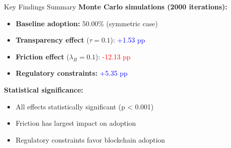 \documentclass{beamer}
\begin{document}
\begin{frame}{Key Findings Summary}
\textbf{Monte Carlo simulations (2000 iterations):}

\vspace{0.3cm}
\begin{itemize}
    \item \textbf{Baseline adoption:} 50.00\% (symmetric case)
    \item \textbf{Transparency effect} ($\tau=0.1$): \textcolor{blue}{+1.53 pp}
    \item \textbf{Friction effect} ($\lambda_B=0.1$): \textcolor{red}{-12.13 pp}
    \item \textbf{Regulatory constraints:} \textcolor{blue}{+5.35 pp}
\end{itemize}

\vspace{0.3cm}
\textbf{Statistical significance:}
\begin{itemize}
    \item All effects statistically significant (p < 0.001)
    \item Friction has largest impact on adoption
    \item Regulatory constraints favor blockchain adoption
\end{itemize}
\end{frame}
\end{document}
